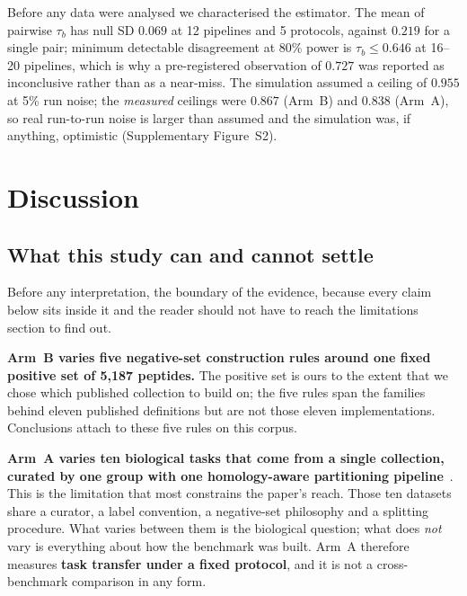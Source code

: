 \documentclass[11pt,a4paper]{article}
\begin{document}
Before any data were analysed we characterised the estimator. The mean of pairwise $\tau_b$
has null SD $0.069$ at 12 pipelines and 5 protocols, against $0.219$ for a single pair;
minimum detectable disagreement at 80\% power is $\tau_b \leq 0.646$ at 16--20 pipelines,
which is why a pre-registered observation of $0.727$ was reported as inconclusive rather
than as a near-miss. The simulation assumed a ceiling of $0.955$ at 5\% run noise; the
\emph{measured} ceilings were $0.867$ (Arm~B) and $0.838$ (Arm~A), so real run-to-run noise
is larger than assumed and the simulation was, if anything, optimistic
(Supplementary Figure~S2).


\section{Discussion}

\subsection{What this study can and cannot settle}
\label{sec:canclaim}

Before any interpretation, the boundary of the evidence, because every claim below sits
inside it and the reader should not have to reach the limitations section to find out.

\textbf{Arm~B varies five negative-set construction rules around one fixed positive set of
5{,}187 peptides.} The positive set is ours to the extent that we chose which published
collection to build on; the five rules span the families behind eleven published definitions
but are not those eleven implementations. Conclusions attach to these five rules on this
corpus.

\textbf{Arm~A varies ten biological tasks that come from a single collection, curated by
one group with one homology-aware partitioning pipeline}~\citep{fernandezdiaz2024autopeptideml}.
This is the limitation that most constrains the paper's reach. Those ten datasets share a
curator, a label convention, a negative-set philosophy and a splitting procedure. What
varies between them is the biological question; what does \emph{not} vary is everything
about how the benchmark was built. Arm~A therefore measures \textbf{task transfer under a
fixed protocol}, and it is not a cross-benchmark comparison in any form.
\end{document}
